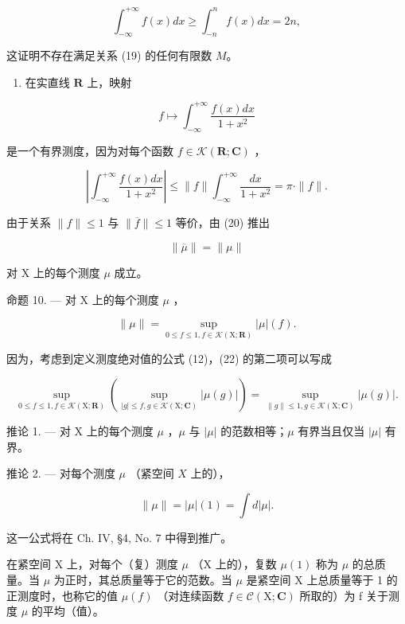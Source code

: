 \[
\int_ {- \infty} ^ {+ \infty} f (x) d x \geqslant \int_ {- n} ^ {n} f (x) d x = 2 n,
\]

这证明不存在满足关系 (19) 的任何有限数 \(M\)。

\begin{enumerate}
\def\labelenumi{\arabic{enumi})}
\setcounter{enumi}{2}
\tightlist
\item
  在实直线 \(\mathbf{R}\) 上，映射
\end{enumerate}

\[
f \mapsto \int_ {- \infty} ^ {+ \infty} \frac {f (x) d x}{1 + x ^ {2}}
\]

是一个有界测度，因为对每个函数 \(f \in \mathcal{K}(\mathbf{R};\mathbf{C})\) ，

\[
\left| \int_ {- \infty} ^ {+ \infty} \frac {f (x) d x}{1 + x ^ {2}} \right| \leqslant \| f \| \int_ {- \infty} ^ {+ \infty} \frac {d x}{1 + x ^ {2}} = \pi \cdot \| f \|.
\]

由于关系 \(\| f\| \leqslant 1\) 与 \(\| \overline{f}\| \leqslant 1\) 等价，由 (20) 推出

\[
\| \overline {{\mu}} \| = \| \mu \|\tag{21}
\]

对 X 上的每个测度 \(\mu\) 成立。

命题 10. --- 对 X 上的每个测度 \(\mu\) ，

\[
\| \mu \| = \sup _ {0 \leqslant f \leqslant 1, f \in \mathcal {K} (\mathrm{X}; \mathbf {R})} | \mu | (f).\tag{22}
\]

因为，考虑到定义测度绝对值的公式 (12)，(22) 的第二项可以写成

\[
\sup _ {0 \leqslant f \leqslant 1, f \in \mathcal {K} (\mathrm{X}; \mathbf {R})} \left(\sup _ {| g | \leqslant f, g \in \mathcal {K} (\mathrm{X}; \mathbf {C})} | \mu (g) |\right) = \sup _ {\| g \| \leqslant 1, g \in \mathcal {K} (\mathrm{X}; \mathbf {C})} | \mu (g) |.
\]

推论 1. --- 对 X 上的每个测度 \(\mu\) ，\(\mu\) 与 \(|\mu|\) 的范数相等；\(\mu\) 有界当且仅当 \(|\mu|\) 有界。

推论 2. --- 对每个测度 \(\mu\) （紧空间 \(X\) 上的），

\[
\| \mu \| = | \mu | (1) = \int d | \mu |.\tag{23}
\]

这一公式将在 Ch. IV, §4, No. 7 中得到推广。

在紧空间 X 上，对每个（复）测度 \(\mu\) （X 上的），复数 \(\mu(1)\) 称为 \(\mu\) 的总质量。当 \(\mu\) 为正时，其总质量等于它的范数。当 \(\mu\) 是紧空间 X 上总质量等于 1 的正测度时，也称它的值 \(\mu(f)\) （对连续函数 \(f \in \mathcal{C}(\mathrm{X};\mathbf{C})\) 所取的）为 f 关于测度 \(\mu\) 的平均（值）。

